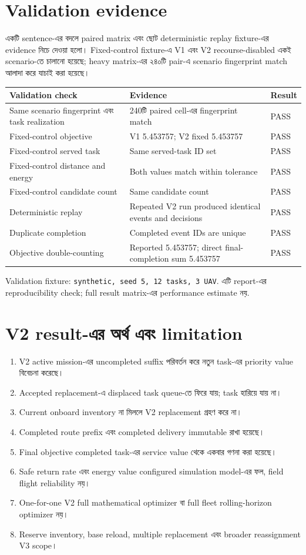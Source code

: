 \documentclass[10pt,a4paper]{article}
\begin{document}
\section{Validation evidence}
একটি sentence-এর বদলে paired matrix এবং ছোট deterministic replay fixture-এর evidence নিচে দেওয়া হলো। Fixed-control fixture-এ V1 এবং V2 recourse-disabled একই scenario-তে চালানো হয়েছে; heavy matrix-এর ২৪০টি pair-এ scenario fingerprint match আলাদা করে যাচাই করা হয়েছে।
\begin{table}[H]\centering\scriptsize\begin{tabular}{@{}p{}p{}l@{}}\toprule Validation check & Evidence & Result\\\midrule
Same scenario fingerprint এবং task realization & 240টি paired cell-এর fingerprint match & PASS\\
Fixed-control objective & V1 5.453757; V2 fixed 5.453757 & PASS\\
Fixed-control served task & Same served-task ID set & PASS\\
Fixed-control distance and energy & Both values match within tolerance & PASS\\
Fixed-control candidate count & Same candidate count & PASS\\
Deterministic replay & Repeated V2 run produced identical events and decisions & PASS\\
Duplicate completion & Completed event IDs are unique & PASS\\
Objective double-counting & Reported 5.453757; direct final-completion sum 5.453757 & PASS\\
\bottomrule\end{tabular}\end{table}
Validation fixture: \texttt{synthetic, seed 5, 12 tasks, 3 UAV}. এটি report-এর reproducibility check; full result matrix-এর performance estimate নয়.
\section{V2 result-এর অর্থ এবং limitation}
\begin{enumerate}
\item V2 active mission-এর uncompleted suffix পরিবর্তন করে নতুন task-এর priority value বিবেচনা করেছে।
\item Accepted replacement-এ displaced task queue-তে ফিরে যায়; task হারিয়ে যায় না।
\item Current onboard inventory না মিললে V2 replacement গ্রহণ করে না।
\item Completed route prefix এবং completed delivery immutable রাখা হয়েছে।
\item Final objective completed task-এর service value থেকে একবার গণনা করা হয়েছে।
\item Safe return rate এবং energy value configured simulation model-এর ফল, field flight reliability নয়।
\item One-for-one V2 full mathematical optimizer বা full fleet rolling-horizon optimizer নয়।
\item Reserve inventory, base reload, multiple replacement এবং broader reassignment V3 scope।
\end{enumerate}
\end{document}
